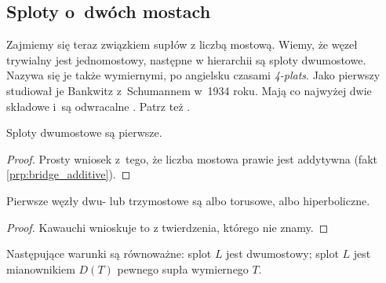 
\subsection{Sploty o~dwóch mostach}
\label{sub:twobridge}%
%
%
Zajmiemy się teraz związkiem supłów z liczbą mostową.
Wiemy, że węzeł trywialny jest jednomostowy, następne w hierarchii są sploty dwumostowe.
Nazywa się je także wymiernymi, po angielsku czasami \emph{4-plats}.
Jako pierwszy studiował je Bankwitz z~Schumannem w~1934 roku.
Mają co najwyżej dwie składowe i~są odwracalne \cite[s. 211]{burde14}.
Patrz też \cite[s. 21-26]{kawauchi96}.

\begin{proposition}
    Sploty dwumostowe są pierwsze.
\end{proposition}

\begin{proof}
    Prosty wniosek z~tego, że liczba mostowa prawie jest addytywna (fakt \ref{prp:bridge_additive}).
\end{proof}

\begin{corollary}
    Pierwsze węzły dwu- lub trzymostowe są albo torusowe, albo hiperboliczne.
\end{corollary}

\begin{proof}
    Kawauchi \cite[s. 130]{kawauchi96} wnioskuje to z twierdzenia, którego nie znamy.
\end{proof}


\begin{proposition}
    Następujące warunki są równoważne: splot $L$ jest dwumostowy; splot $L$ jest mianownikiem $D(T)$ pewnego supła wymiernego $T$.
\end{proposition}

